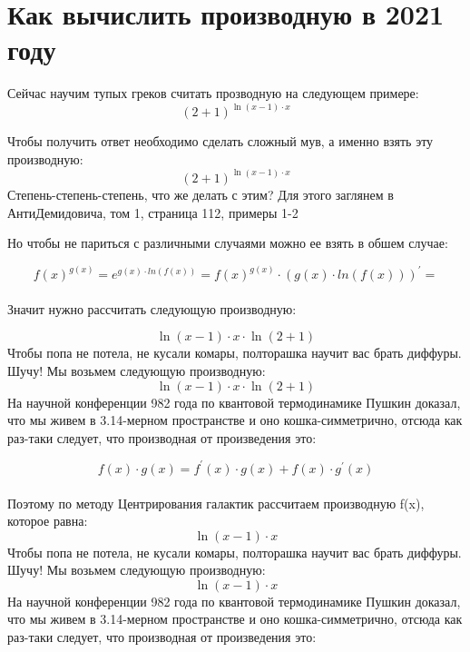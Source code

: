 \documentclass[a4paper,12pt]{article}
\begin{document}
\section{Как вычислить производную в 2021 году}

Сейчас научим тупых греков считать прозводную на следующем примере:
\begin{equation}
\left(2+1\right)^{\ln(x-1)  \cdot x} 
\end{equation} 

Чтобы получить ответ необходимо сделать сложный мув, а именно взять эту производную:
\begin{equation}
\left(2+1\right)^{\ln(x-1)  \cdot x} 
\end{equation} 
Степень-степень-степень, что же делать с этим? Для этого заглянем в АнтиДемидовича, том 1, страница 112, примеры 1-2

Но чтобы не париться с различными случаями можно ее взять в обшем случае:

  \begin{equation}
  f(x)^{g(x)} = e^{g(x)\cdot ln(f(x))}  = f(x)^{g(x)} \cdot \left(g(x)\cdot ln(f(x)) \right)^{'} =  
 \end{equation} \\Значит нужно рассчитать следующую производную:

\begin{equation}
\ln(x-1)  \cdot x \cdot \ln(2+1) 
\end{equation} 
Чтобы попа не потела, не кусали комары, полторашка научит вас брать диффуры. Шучу! Мы возьмем следующую производную:
\begin{equation}
\ln(x-1)  \cdot x \cdot \ln(2+1) 
\end{equation} 
На научной конференции 982 года по квантовой термодинамике Пушкин доказал, что мы живем в 3.14-мерном пространстве и оно кошка-симметрично, отсюда как раз-таки следует, что производная от произведения это:

  \begin{equation}
  f(x) \cdot g(x) = f^{'}(x) \cdot g(x) + f(x) \cdot g^{'}(x)
 \end{equation} \\Поэтому по методу Центрирования галактик рассчитаем производную f(x), которое равна: 
\begin{equation}
\ln(x-1)  \cdot x
\end{equation} 
Чтобы попа не потела, не кусали комары, полторашка научит вас брать диффуры. Шучу! Мы возьмем следующую производную:
\begin{equation}
\ln(x-1)  \cdot x
\end{equation} 
На научной конференции 982 года по квантовой термодинамике Пушкин доказал, что мы живем в 3.14-мерном пространстве и оно кошка-симметрично, отсюда как раз-таки следует, что производная от произведения это:
\end{document}
